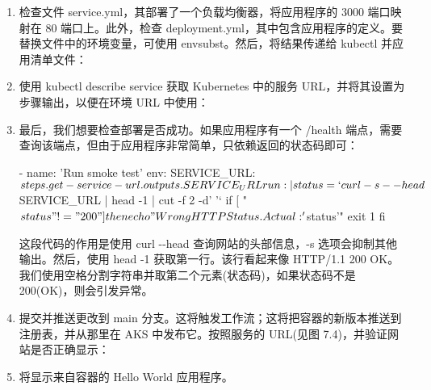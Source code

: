 \begin{enumerate}
\item 
检查文件 service.yml，其部署了一个负载均衡器，将应用程序的 3000 端口映射在 80 端口上。此外，检查 deployment.yml，其中包含应用程序的定义。要替换文件中的环境变量，可使用 envsubst。然后，将结果传递给 kubectl 并应用清单文件：


\item 
使用 kubectl describe service 获取 Kubernetes 中的服务 URL，并将其设置为步骤输出，以便在环境 URL 中使用：


\item 
最后，我们想要检查部署是否成功。如果应用程序有一个 /health 端点，需要查询该端点，但由于应用程序非常简单，只依赖返回的状态码即可：

\begin{shell}
- name: 'Run smoke test'
  env:
    SERVICE_URL: ${{ steps.get-service-url.outputs.SERVICE_URL}}
  run: |
   status=`curl -s --head $SERVICE_URL | head -1 | cut -f 2 -d' '`
  if [ "$status" != "200" ]
  then
    echo "Wrong HTTP Status. Actual: '$status'"
    exit 1
  fi
\end{shell}

这段代码的作用是使用 curl -{}-head 查询网站的头部信息，-s 选项会抑制其他输出。然后，使用 head -1 获取第一行。该行看起来像 HTTP/1.1 200 OK。我们使用空格分割字符串并取第二个元素(状态码)，如果状态码不是 200(OK)，则会引发异常。

\item 
提交并推送更改到 main 分支。这将触发工作流；这将把容器的新版本推送到注册表，并从那里在 AKS 中发布它。按照服务的 URL(见图 7.4)，并验证网站是否正确显示：


\item 
将显示来自容器的 Hello World 应用程序。
\end{enumerate}

